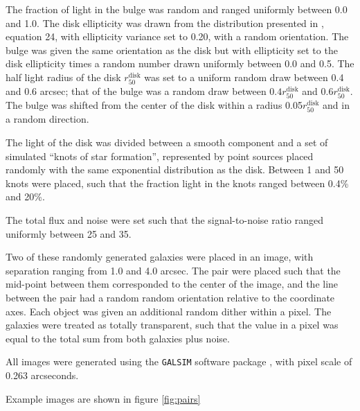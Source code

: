 \documentclass[fleqn,useAMS,usenatbib]{mnras}
\begin{document}
The fraction of light in the bulge was random and ranged uniformly between 0.0
and 1.0. The disk ellipticity was drawn from the distribution presented in
\cite{ba14}, equation 24, with ellipticity variance set to 0.20, with a random
orientation.  The bulge was given the same orientation as the disk but with
ellipticity set to the disk ellipticity times a random number drawn uniformly
between 0.0 and 0.5.  The half light radius of the disk
$r_{50}^{\mathrm{disk}}$ was set to a uniform random draw between 0.4 and 0.6
arcsec; that of the bulge was a random draw between $0.4
r_{50}^{\mathrm{disk}}$ and $0.6 r_{50}^{\mathrm{disk}}$.  The bulge was
shifted from the center of the disk within a radius
0.05$r_{50}^{\mathrm{disk}}$ and in a random direction.

The light of the disk was divided between a smooth component and a set of
simulated ``knots of star formation'', represented by point sources placed
randomly with the same exponential distribution as the disk.  Between 1 and 50
knots were placed, such that the fraction light in the knots ranged between
0.4\% and 20\%.

The total flux and noise were set such that the signal-to-noise ratio ranged
uniformly between 25 and 35.

Two of these randomly generated galaxies were placed in an image, with
separation ranging from 1.0 and 4.0 arcsec. The pair were placed such that the
mid-point between them corresponded to the center of the image, and the line
between the pair had a random random orientation relative to the coordinate
axes.  Each object was given an additional random dither within a pixel.
The galaxies were treated as totally transparent, such that the value in
a pixel was equal to the total sum from both galaxies plus noise.

All images were generated using the \texttt{GALSIM} software package
\citep{GALSIM2015}, with pixel scale of 0.263 arcseconds.

Example images are shown in figure \ref{fig:pairs}
\end{document}
